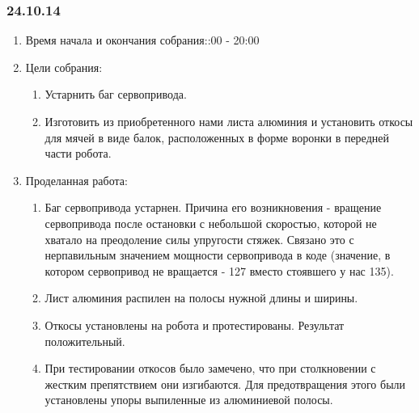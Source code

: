 
\subsubsection{24.10.14}

\begin{enumerate}
	\item Время начала и окончания собрания::00 - 20:00
	\item Цели собрания:\newline
	\begin{enumerate}
	  \item Устарнить баг сервопривода.\newline
	  
	  \item Изготовить из приобретенного нами листа алюминия и установить откосы для мячей в виде балок, расположенных в форме воронки в передней части робота.\newline
	  
    \end{enumerate}
    
	\item Проделанная работа:\newline
	\begin{enumerate}
	  \item Баг сервопривода устарнен. Причина его возникновения - вращение сервопривода после остановки с небольшой скоростью, которой не хватало на преодоление силы упругости стяжек. Связано это с нерпавильным значением мощности сервопривода в коде (значение, в котором сервопривод не вращается - 127 вместо стоявшего у нас 135).\newline
      
      \item Лист алюминия распилен на полосы нужной длины и ширины.\newline
      
      \item Откосы установлены на робота и протестированы. Результат положительный.\newline
      
      \item При тестировании откосов было замечено, что при столкновении с жестким препятствием они изгибаются. Для предотвращения этого были установлены упоры выпиленные из алюминиевой полосы.\newline
      

\end{enumerate}
\end{enumerate}
